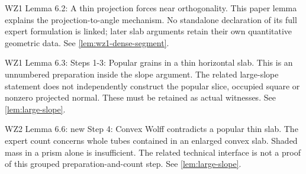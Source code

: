 \begin{remark}
\label{rem:atlas-L6_2}
WZ1 Lemma 6.2: A thin projection forces near orthogonality.
This paper lemma explains the projection-to-angle mechanism. No standalone declaration of its full expert formulation is linked; later slab arguments retain their own quantitative geometric data.
See \ref{lem:wz1-dense-segment}.
\end{remark}

\begin{remark}
\label{rem:atlas-W1SlabPrep}
WZ1 Lemma 6.3: Steps 1-3: Popular grains in a thin horizontal slab.
This is an unnumbered preparation inside the slope argument. The related large-slope statement does not independently construct the popular slice, occupied square or nonzero projected normal. These must be retained as actual witnesses.
See \ref{lem:large-slope}.
\end{remark}

\begin{remark}
\label{rem:atlas-W2SlabCount}
WZ2 Lemma 6.6: new Step 4: Convex Wolff contradicts a popular thin slab.
The expert count concerns whole tubes contained in an enlarged convex slab. Shaded mass in a prism alone is insufficient. The related technical interface is not a proof of this grouped preparation-and-count step.
See \ref{lem:large-slope}.
\end{remark}

